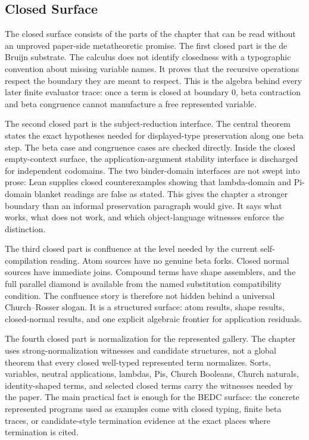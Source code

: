 \subsection{Closed Surface}
\label{subsec:session-closing-closed-surface}

The closed surface consists of the parts of the chapter that can be read
without an unproved paper-side metatheoretic promise.  The first closed part
is the de Bruijn substrate.  The calculus does not identify closedness with a
typographic convention about missing variable names.  It proves that the
recursive operations respect the boundary they are meant to respect.  This is
the algebra behind every later finite evaluator trace: once a term is closed
at boundary $0$, beta contraction and beta congruence cannot manufacture a
free represented variable.

The second closed part is the subject-reduction interface.  The central
theorem states the exact hypotheses needed for displayed-type preservation
along one beta step.  The beta case and congruence cases are checked directly.
Inside the closed empty-context surface, the application-argument stability
interface is discharged for independent codomains.  The two binder-domain
interfaces are not swept into prose: Lean supplies closed counterexamples
showing that lambda-domain and Pi-domain blanket readings are false as stated.
This gives the chapter a stronger boundary than an informal preservation
paragraph would give.  It says what works, what does not work, and which
object-language witnesses enforce the distinction.

The third closed part is confluence at the level needed by the current
self-compilation reading.  Atom sources have no genuine beta forks.  Closed
normal sources have immediate joins.  Compound terms have shape assemblers,
and the full parallel diamond is available from the named substitution
compatibility condition.  The confluence story is therefore not hidden behind
a universal Church--Rosser slogan.  It is a structured surface: atom results,
shape results, closed-normal results, and one explicit algebraic frontier for
application residuals.

The fourth closed part is normalization for the represented gallery.  The
chapter uses strong-normalization witnesses and candidate structures, not a
global theorem that every closed well-typed represented term normalizes.
Sorts, variables, neutral applications, lambdas, Pis, Church Booleans, Church
naturals, identity-shaped terms, and selected closed terms carry the witnesses
needed by the paper.  The main practical fact is enough for the BEDC surface:
the concrete represented programs used as examples come with closed typing,
finite beta traces, or candidate-style termination evidence at the exact
places where termination is cited.


